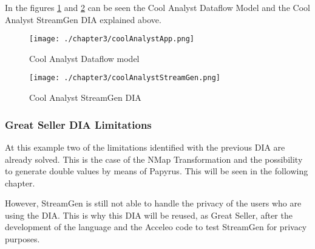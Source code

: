 In the figures \ref{fig:Cool Analyst Dataflow model} and \ref{fig:Cool Analyst StreamGen DIA} can be seen the Cool Analyst Dataflow Model and the Cool Analyst StreamGen DIA explained above.

\begin{figure}
\centering
{\texttt{[image: ./chapter3/coolAnalystApp.png]}}
\caption{Cool Analyst Dataflow model}
\label{fig:Cool Analyst Dataflow model}
\end{figure}

\begin{figure}
\centering
{\texttt{[image: ./chapter3/coolAnalystStreamGen.png]}}
\caption{Cool Analyst StreamGen DIA}
\label{fig:Cool Analyst StreamGen DIA}
\end{figure}

\subsubsection*{Great Seller DIA Limitations}

At this example two of the limitations identified with the previous DIA are already solved. This is the case of the NMap Transformation and the possibility to generate double values by means of Papyrus. This will be seen in the following chapter.

However, StreamGen is still not able to handle the privacy of the users who are using the DIA. This is why this DIA will be reused, as Great Seller, after the development of the language and the Acceleo code to test StreamGen for privacy purposes.
